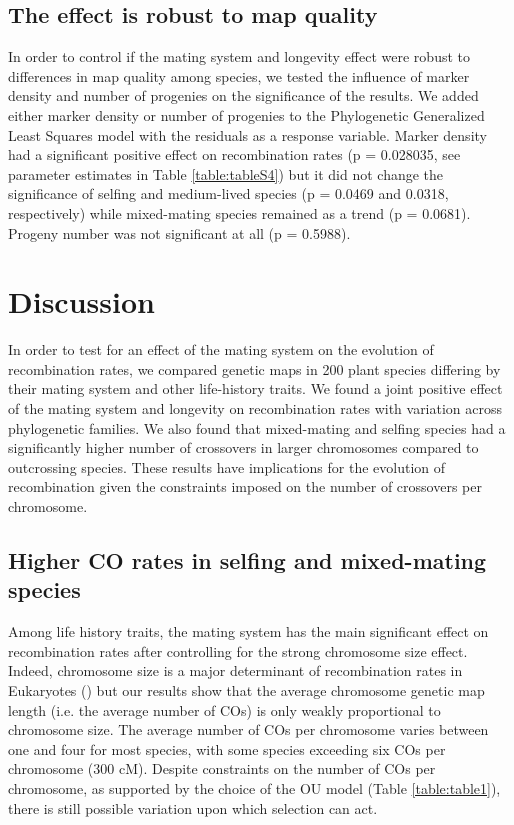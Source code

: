 \documentclass{article}
\begin{document}
\subsection*{The effect is robust to map quality}


In order to control if the mating system and longevity effect were robust to differences in map quality among species, we tested the influence of marker density and number of progenies on the significance of the results. We added either marker density or number of progenies to the Phylogenetic Generalized Least Squares model with the residuals as a response variable. Marker density had a significant positive effect on recombination rates (p = 0.028035, see parameter estimates in Table \ref{table:tableS4}) but it did not change the significance of selfing and medium-lived species (p = 0.0469 and 0.0318, respectively) while mixed-mating species remained as a trend (p = 0.0681). Progeny number was not significant at all (p = 0.5988).


\section*{Discussion}

In order to test for an effect of the mating system on the evolution of recombination rates, we compared genetic maps in 200 plant species differing by their mating system and other life-history traits. We found a joint positive effect of the mating system and longevity on recombination rates with variation across phylogenetic families. We also found that mixed-mating and selfing species had a significantly higher number of crossovers in larger chromosomes compared to outcrossing species. These results have implications for the evolution of recombination given the constraints imposed on the number of crossovers per chromosome.


\subsection*{Higher CO rates in selfing and mixed-mating species}


Among life history traits, the mating system has the main significant effect on recombination rates after controlling for the strong chromosome size effect. Indeed, chromosome size is a major determinant of recombination rates in Eukaryotes (\cite{brazierDiversityDeterminantsRecombination2022b,stapleyVariationRecombinationFrequency2017,haenelMetaanalysisChromosomescaleCrossover2018}) but our results show that the average chromosome genetic map length (i.e. the average number of COs) is only weakly proportional to chromosome size. The average number of COs per chromosome varies between one and four for most species, with some species exceeding six COs per chromosome (300 cM). Despite constraints on the number of COs per chromosome, as supported by the choice of the OU model (Table \ref{table:table1}), there is still possible variation upon which selection can act.
\end{document}
